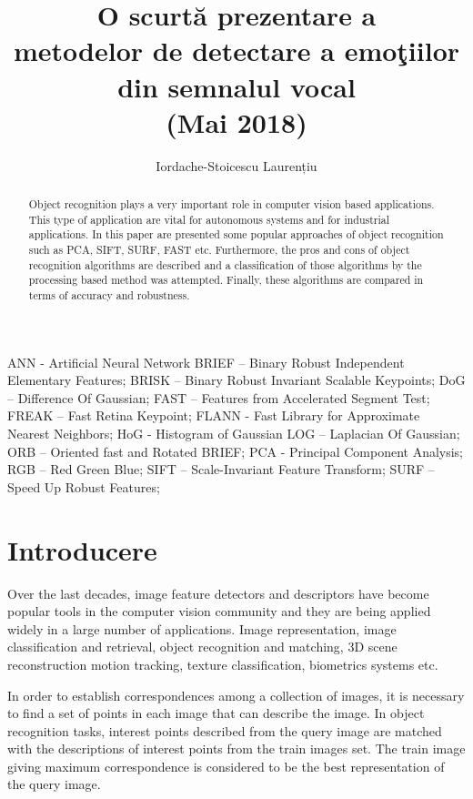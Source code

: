 \documentclass[9pt,shortpaper,twoside,web]{ieeecolor}
\begin{document}
\title{
O scurtă prezentare a \\
metodelor de detectare a emoţiilor din semnalul vocal  \\ 
(Mai 2018)}
\author{Iordache-Stoicescu Laurențiu}

\maketitle


\begin{abstract}
Object recognition plays a very important role in computer vision based applications. This type of application 
are vital for autonomous systems and for industrial applications. In this paper are presented some popular approaches 
of object recognition such as PCA, SIFT, SURF, FAST etc. Furthermore, the pros and cons of object recognition algorithms 
are described and a classification of those algorithms by the processing based method was attempted. Finally, these 
algorithms are compared in terms of accuracy and robustness.
\end{abstract}

\begin{IEEEkeywords}
ANN - Artificial Neural Network
BRIEF – Binary Robust Independent Elementary Features; 
BRISK – Binary Robust Invariant Scalable Keypoints; 
DoG – Difference Of Gaussian; 
FAST – Features from Accelerated Segment Test; 
FREAK – Fast Retina Keypoint;
FLANN - Fast Library for Approximate Nearest Neighbors;
HoG - Histogram of Gaussian
LOG – Laplacian Of Gaussian; 
ORB – Oriented fast and Rotated BRIEF; 
PCA - Principal Component Analysis;
RGB – Red Green Blue; 
SIFT – Scale-Invariant Feature Transform; 
SURF – Speed Up Robust Features; 
\end{IEEEkeywords}

\section{Introducere}
\label{sec:introduction}

Over the last decades, image feature detectors and descriptors have become popular tools in the computer vision community and they are being applied widely in a large number of applications. Image representation, image classification and retrieval, object recognition and matching, 3D scene reconstruction motion tracking, texture classification, biometrics systems etc. 

In order to establish correspondences among a collection of images, it is necessary to find a set of points in each image that can describe the image.
In object recognition tasks, interest points described from the query image are matched with the descriptions of interest points from the train images set. The train image giving maximum correspondence is considered to be the best representation of the query image.
\end{document}
